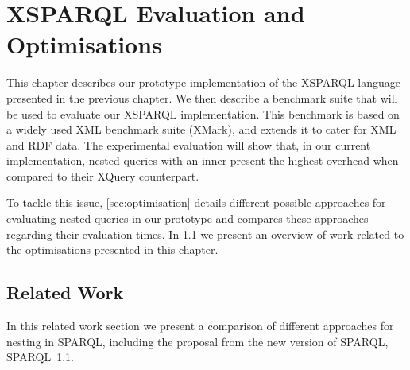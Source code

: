 \chapter{XSPARQL Evaluation and Optimisations}
\label{cha:optimisations}

\def\plotsDir{5-optimisations/benchmarks/results/2012.08.13-10.06/plots/}


This chapter describes our prototype implementation of the XSPARQL language presented in the previous chapter.
%
We then describe a benchmark suite that will be used to evaluate our XSPARQL implementation.  This benchmark is based on
a widely used \ac{XML} benchmark suite (XMark), and extends it to cater for \ac{XML} and \ac{RDF} data. 
%
The experimental evaluation will show that, in our current implementation, nested queries with an inner \SparqlForClause
present the highest overhead when compared to their XQuery counterpart.

To tackle this issue, \cref{sec:optimisation} details different possible approaches for evaluating nested queries
in our prototype and compares these approaches regarding their evaluation times.  
%
In \cref{sec:related-work-optimisations} we present an overview of work related to the optimisations presented in
this chapter.









\section{Related Work}
\label{sec:related-work-optimisations}


In this related work section we present a comparison of different approaches for nesting in SPARQL, including the
proposal from the new version of SPARQL, SPARQL~1.1.

